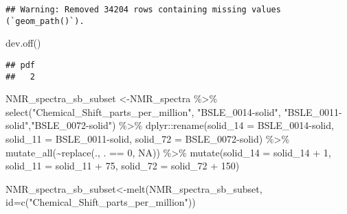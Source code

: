 \documentclass[
]{article}
\newenvironment{Shaded}{\begin{snugshade}}{\end{snugshade}}
\newcommand{\AttributeTok}[1]{\textcolor[rgb]{0.77,0.63,0.00}{#1}}
\newcommand{\ConstantTok}[1]{\textcolor[rgb]{0.00,0.00,0.00}{#1}}
\newcommand{\DecValTok}[1]{\textcolor[rgb]{0.00,0.00,0.81}{#1}}
\newcommand{\FunctionTok}[1]{\textcolor[rgb]{0.00,0.00,0.00}{#1}}
\newcommand{\NormalTok}[1]{#1}
\newcommand{\OtherTok}[1]{\textcolor[rgb]{0.56,0.35,0.01}{#1}}
\newcommand{\SpecialCharTok}[1]{\textcolor[rgb]{0.00,0.00,0.00}{#1}}
\newcommand{\StringTok}[1]{\textcolor[rgb]{0.31,0.60,0.02}{#1}}
\begin{document}
\begin{verbatim}
## Warning: Removed 34204 rows containing missing values (`geom_path()`).
\end{verbatim}

\begin{Shaded}
\begin{Highlighting}[]
\FunctionTok{dev.off}\NormalTok{()}
\end{Highlighting}
\end{Shaded}

\begin{verbatim}
## pdf 
##   2
\end{verbatim}

\begin{Shaded}
\begin{Highlighting}[]
\NormalTok{NMR\_spectra\_sb\_subset }\OtherTok{\textless{}{-}}\NormalTok{NMR\_spectra }\SpecialCharTok{\%\textgreater{}\%}
  \FunctionTok{select}\NormalTok{(}\StringTok{"Chemical\_Shift\_parts\_per\_million"}\NormalTok{, }\StringTok{"BSLE\_0014{-}solid"}\NormalTok{, }\StringTok{"BSLE\_0011{-}solid"}\NormalTok{,}\StringTok{"BSLE\_0072{-}solid"}\NormalTok{) }\SpecialCharTok{\%\textgreater{}\%}
\NormalTok{  dplyr}\SpecialCharTok{::}\FunctionTok{rename}\NormalTok{(}\StringTok{\textquotesingle{}solid\_14\textquotesingle{}} \OtherTok{=} \StringTok{\textquotesingle{}BSLE\_0014{-}solid\textquotesingle{}}\NormalTok{,}
                \StringTok{\textquotesingle{}solid\_11\textquotesingle{}} \OtherTok{=} \StringTok{\textquotesingle{}BSLE\_0011{-}solid\textquotesingle{}}\NormalTok{,}
                \StringTok{\textquotesingle{}solid\_72\textquotesingle{}} \OtherTok{=} \StringTok{\textquotesingle{}BSLE\_0072{-}solid\textquotesingle{}}\NormalTok{) }\SpecialCharTok{\%\textgreater{}\%}
  \FunctionTok{mutate\_all}\NormalTok{(}\SpecialCharTok{\textasciitilde{}}\FunctionTok{replace}\NormalTok{(., . }\SpecialCharTok{==} \DecValTok{0}\NormalTok{, }\ConstantTok{NA}\NormalTok{)) }\SpecialCharTok{\%\textgreater{}\%}
  \FunctionTok{mutate}\NormalTok{(}\AttributeTok{solid\_14 =}\NormalTok{ solid\_14 }\SpecialCharTok{+} \DecValTok{1}\NormalTok{,}
         \AttributeTok{solid\_11 =}\NormalTok{ solid\_11 }\SpecialCharTok{+} \DecValTok{75}\NormalTok{,}
         \AttributeTok{solid\_72 =}\NormalTok{ solid\_72 }\SpecialCharTok{+} \DecValTok{150}\NormalTok{) }
         
\NormalTok{NMR\_spectra\_sb\_subset}\OtherTok{\textless{}{-}}\FunctionTok{melt}\NormalTok{(NMR\_spectra\_sb\_subset, }\AttributeTok{id=}\FunctionTok{c}\NormalTok{(}\StringTok{"Chemical\_Shift\_parts\_per\_million"}\NormalTok{))}


\end{Highlighting}
\end{Shaded}
\end{document}
